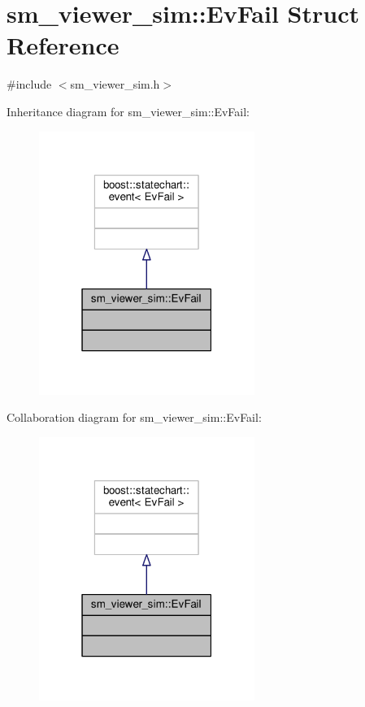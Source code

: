 \hypertarget{structsm__viewer__sim_1_1EvFail}{}\section{sm\+\_\+viewer\+\_\+sim\+:\+:Ev\+Fail Struct Reference}
\label{structsm__viewer__sim_1_1EvFail}


{\ttfamily \#include $<$sm\+\_\+viewer\+\_\+sim.\+h$>$}



Inheritance diagram for sm\+\_\+viewer\+\_\+sim\+:\+:Ev\+Fail\+:\nopagebreak
\begin{figure}[H]
\begin{center}
\leavevmode
\includegraphics[width=199pt]{structsm__viewer__sim_1_1EvFail__inherit__graph}
\end{center}
\end{figure}


Collaboration diagram for sm\+\_\+viewer\+\_\+sim\+:\+:Ev\+Fail\+:\nopagebreak
\begin{figure}[H]
\begin{center}
\leavevmode
\includegraphics[width=199pt]{structsm__viewer__sim_1_1EvFail__coll__graph}
\end{center}
\end{figure}


